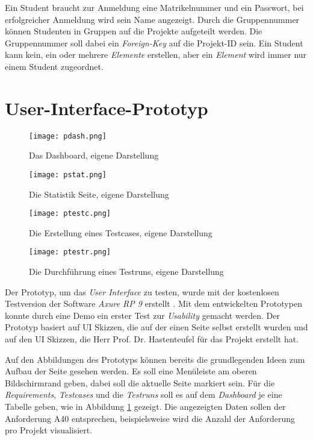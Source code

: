 \documentclass[11pt,a4paper]{report}
\begin{document}
Ein Student braucht zur Anmeldung eine Matrikelnummer und ein Passwort, bei erfolgreicher Anmeldung wird sein Name angezeigt. Durch die Gruppennummer können Studenten in Gruppen auf die Projekte aufgeteilt werden. Die Gruppennummer soll dabei ein \textit{Foreign-Key} auf die Projekt-ID sein. Ein Student kann kein, ein oder mehrere \textit{Elemente} erstellen, aber ein \textit{Element} wird immer nur einem Student zugeordnet.










\section{User-Interface-Prototyp} 
\label{s:ui}

\begin{figure}[htpb]
  \centering
  \texttt{[image: pdash.png]}
  \caption{Das Dashboard, eigene Darstellung}
  \label{f:pdash}
\end{figure}


\begin{figure}[htpb]
  \centering
  \texttt{[image: pstat.png]}
  \caption{Die Statistik Seite, eigene Darstellung}
  \label{f:pstat}
\end{figure}



\begin{figure}[htpb]
  \centering
  \texttt{[image: ptestc.png]}
  \caption{Die Erstellung eines Testcases, eigene Darstellung}
  \label{f:ptestc}
\end{figure}


\begin{figure}[htpb]
  \centering
  \texttt{[image: ptestr.png]}
  \caption{Die Durchführung eines Testruns, eigene Darstellung}
  \label{f:ptestr}
\end{figure}


Der Prototyp, um das \textit{User Interface} zu testen, wurde mit der kostenlosen Testversion der Software \textit{Axure RP 9} erstellt \cite{axure}. Mit dem entwickelten Prototypen konnte durch eine Demo ein erster Test zur \textit{Usability} gemacht werden. Der Prototyp basiert auf UI Skizzen, die auf der einen Seite selbst erstellt wurden und auf den UI Skizzen, die Herr Prof. Dr. Hastenteufel für das Projekt erstellt hat.

Auf den Abbildungen des Prototyps können bereits die grundlegenden Ideen zum Aufbau der Seite gesehen werden. Es soll eine Menüleiste am oberen Bildschirmrand geben, dabei soll die aktuelle Seite markiert sein. Für die \textit{Requirements}, \textit{Testcases} und die \textit{Testruns} soll es auf dem \textit{Dashboard} je eine Tabelle geben, wie in Abbildung \ref{f:pdash} gezeigt. Die angezeigten Daten sollen der Anforderung A40 entsprechen, beispielsweise wird die Anzahl der Anforderung pro Projekt visualisiert.
\end{document}
